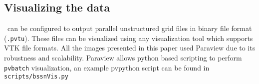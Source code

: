 \subsection{Visualizing the data}
\dendro\  can be configured to output parallel unstructured grid files in 
binary file format (\texttt{.pvtu}).   
These files can be visualized using any visualization tool which supports 
VTK file formats. All the images presented in this paper used Paraview 
due to its robustness and scalability. Paraview allows python based 
scripting to perform \texttt{pvbatch} visualization, an example pvpython 
script can be found in \texttt{scripts/bssnVis.py}

